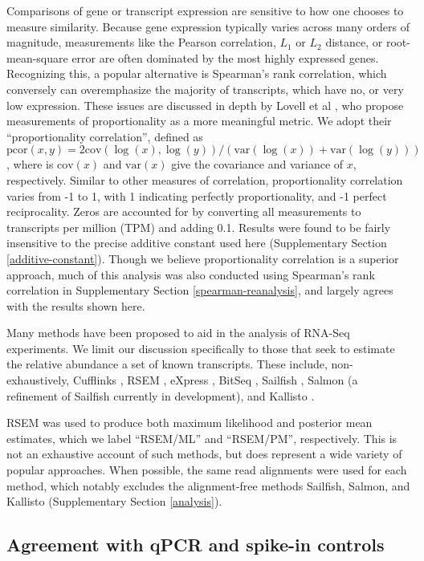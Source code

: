 \documentclass[twocolumn]{article}
\begin{document}
Comparisons of gene or transcript expression are sensitive to how one chooses to
measure similarity. Because gene expression typically varies across many orders
of magnitude, measurements like the Pearson correlation, $L_1$ or $L_2$
distance, or root-mean-square error are often dominated by the most highly
expressed genes. Recognizing this, a popular alternative is Spearman's rank
correlation, which conversely can overemphasize the majority of transcripts,
which have no, or very low expression. These issues are discussed in depth by
Lovell et al \cite{Lovell:2015il}, who propose measurements of proportionality
as a more meaningful metric. We adopt their ``proportionality correlation'',
defined as $\text{pcor}(x, y) = 2\text{cov}(\log(x), \log(y)) /
(\text{var}(\log(x)) + \text{var}(\log(y)))$, where is $\text{cov}(x)$ and
$\text{var}(x)$ give the covariance and variance of $x$, respectively. Similar
to other measures of correlation, proportionality correlation varies from -1 to
1, with 1 indicating perfectly proportionality, and -1 perfect reciprocality.
Zeros are accounted for by converting all measurements to transcripts per
million (TPM) and adding 0.1. Results were found to be fairly insensitive to the
precise additive constant used here (Supplementary Section
\ref{additive-constant}). Though we believe proportionality correlation is a
superior approach, much of this analysis was also conducted using Spearman's
rank correlation in Supplementary Section \ref{spearman-reanalysis}, and largely
agrees with the results shown here.

Many methods have been proposed to aid in the analysis of RNA-Seq
experiments. We limit our discussion specifically to those that seek to
estimate the relative abundance a set of known transcripts. These
include, non-exhaustively, Cufflinks \cite{Trapnell:2010kd},
RSEM \cite{Li:2011cb},
eXpress \cite{Roberts:2012dh},
BitSeq \cite{Glaus:2012ek},
Sailfish \cite{Patro:2014jd},
Salmon (a refinement of Sailfish currently in development), and
Kallisto \cite{Bray:2015uj}.

RSEM was used to produce both maximum likelihood and posterior mean estimates,
which we label ``RSEM/ML'' and ``RSEM/PM'', respectively.  This is not an
exhaustive account of such methods, but does represent a wide variety of popular
approaches. When possible, the same read alignments were used for each method,
which notably excludes the alignment-free methods Sailfish, Salmon, and
Kallisto (Supplementary Section \ref{analysis}).

\subsection{Agreement with qPCR and spike-in controls}
\end{document}
